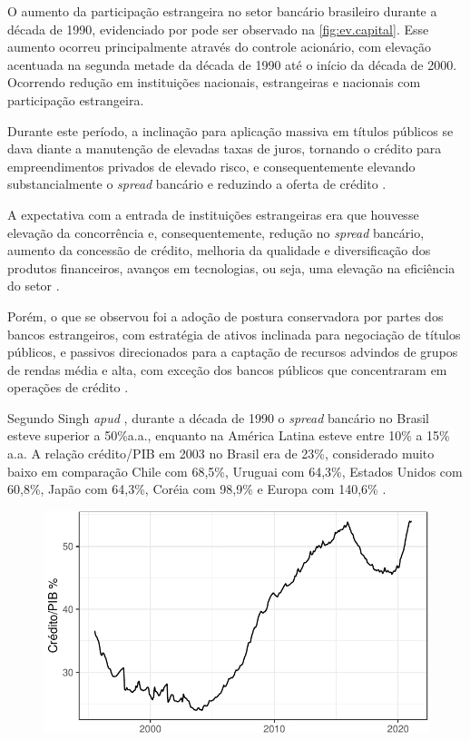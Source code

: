 \documentclass[12pt,openright,oneside,a4paper,chapter=TITLE,section=TITLE,subsection=Title,english,french,spanish,portugues,sumario=tradicional]{04-class-files/abntex2}
\begin{document}
O aumento da participação estrangeira no setor bancário brasileiro durante a
década de 1990, evidenciado por \textcite{camargo:2009} pode ser observado na
\autoref{fig:ev.capital}. Esse aumento ocorreu principalmente através do
controle acionário, com elevação acentuada na segunda metade da década de 1990
até o início da década de 2000. Ocorrendo redução em instituições
nacionais, estrangeiras e nacionais com participação estrangeira.

Durante este período, a inclinação para aplicação massiva em títulos públicos
se dava diante a manutenção de elevadas taxas de juros, tornando o crédito para
empreendimentos privados de elevado risco, e consequentemente elevando
substancialmente o \emph{spread} bancário e reduzindo a oferta de crédito
\cite{camargo:2009}.

A expectativa com a entrada de instituições estrangeiras era que houvesse
elevação da concorrência e, consequentemente, redução no \emph{spread} bancário,
aumento da concessão de crédito, melhoria da qualidade e diversificação dos
produtos financeiros, avanços em tecnologias, ou seja, uma elevação na
eficiência do setor \cite{camargo:2009}.

Porém, o que se observou foi a adoção de postura conservadora por partes dos
bancos estrangeiros, com estratégia de ativos inclinada para negociação de
títulos públicos, e passivos direcionados para a captação de recursos advindos
de grupos de rendas média e alta, com exceção dos bancos públicos que
concentraram em operações de crédito \cite{camargo:2009}.

Segundo Singh \emph{apud} \textcite{leal:2006}, durante a década de 1990 o \emph{spread}
bancário no Brasil esteve superior a 50\%a.a., enquanto na América Latina esteve
entre 10\% a 15\% a.a. A relação crédito/PIB em 2003 no Brasil era de 23\%,
considerado muito baixo em comparação Chile com 68,5\%, Uruguai com 64,3\%, Estados Unidos com 60,8\%, Japão com 64,3\%, Coréia com 98,9\% e Europa com 140,6\% \cite{camargo:2009, leal:2006}.

\begin{figure}

\begin{center}\includegraphics{12-exportedfigures/credit gdp-1} \end{center}
\label{fig:credgdp}
\end{figure}
\end{document}
